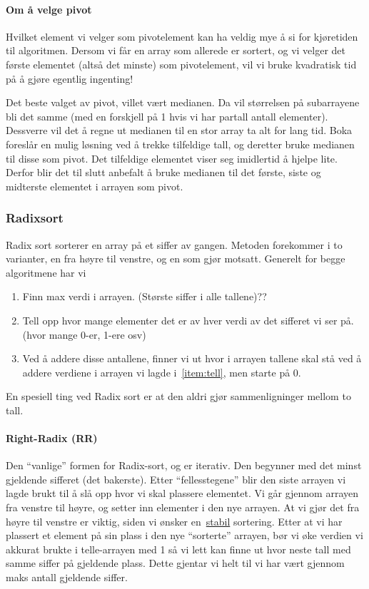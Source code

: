 \paragraph{Om å velge pivot}
Hvilket element vi velger som pivotelement kan ha veldig mye å si for kjøretiden
til algoritmen. Dersom vi får en array som allerede er sortert, og vi velger det
første elementet (altså det minste) som pivotelement, vil vi bruke kvadratisk
tid på å gjøre egentlig ingenting!

Det beste valget av pivot, villet vært medianen. Da vil størrelsen på
subarrayene bli det samme (med en forskjell på 1 hvis vi har partall antall
elementer). Dessverre vil det å regne ut medianen til en stor array ta alt for
lang tid. Boka foreslår en mulig løsning ved å trekke tilfeldige tall, og
deretter bruke medianen til disse som pivot. Det tilfeldige elementet viser seg
imidlertid å hjelpe lite. Derfor blir det til slutt anbefalt å bruke medianen
til det første, siste og midterste elementet i arrayen som pivot.



\subsubsection{\color{red}Radixsort}\label{radixsort}
Radix sort sorterer en array på et siffer av gangen.
Metoden forekommer i to varianter, en fra høyre til venstre, og en som gjør
motsatt. Generelt for begge algoritmene har vi
\begin{enumerate}
\item Finn max verdi i arrayen. (Største siffer i alle tallene)\color{red}??
\item\label{item:tell} Tell opp hvor mange elementer det er av hver verdi av det sifferet vi ser
  på. (hvor mange 0-er, 1-ere osv)
\item Ved å addere disse antallene, finner vi ut hvor i arrayen tallene skal stå
  ved å addere verdiene i arrayen vi lagde i~\ref{item:tell}, men starte på 0.
\end{enumerate}
En spesiell ting ved Radix sort er at den aldri gjør sammenligninger mellom to
tall.

\paragraph{\color{red}Right-Radix (RR)}
Den ``vanlige'' formen for Radix-sort, og er iterativ.
Den begynner med det minst gjeldende sifferet (det bakerste). Etter
``fellesstegene'' blir den siste arrayen vi lagde brukt til å slå opp hvor vi
skal plassere elementet. Vi går gjennom arrayen fra venstre til høyre, og setter
inn elementer i den nye arrayen. At vi gjør det fra høyre til venstre er viktig,
siden vi ønsker en~\hyperref[stabil]{stabil} sortering. Etter at vi har plassert
et element på sin plass i den nye ``sorterte'' arrayen, bør vi øke verdien vi
akkurat brukte i telle-arrayen med 1 så vi lett kan finne ut hvor neste tall med
samme siffer på gjeldende plass. Dette gjentar vi helt til vi har vært gjennom
maks antall gjeldende siffer.



